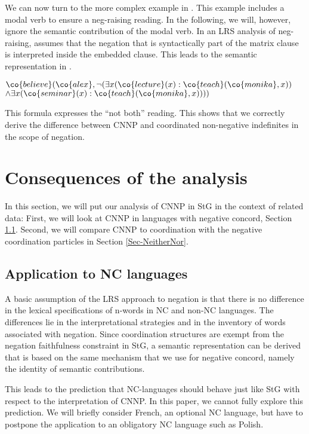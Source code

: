 \documentclass[output=paper]{langsci/langscibook}
\begin{document}
We can now turn to the more complex example in . 
This example includes a modal verb to ensure a neg-raising reading. 
In the following, we will, however, ignore the semantic contribution of the modal verb.
In an LRS analysis of neg-raising, \citet{Sailer:05cssp} assumes that the negation that is syntactically part of the matrix clause is interpreted inside the embedded clause. This leads to the semantic representation in .%

\ea \label{ex-glaub-notEX2-bi}
$\co{believe}(\co{alex},\lnot (\exists x (\co{lecture}(x) : \co{teach}(\co{monika},x))$\\
\hspace*{\fill}
$\land \exists x (\co{seminar}(x) : \co{teach}(\co{monika},x))))$
\z 

This formula expresses the ``not both'' reading. This shows that we correctly derive the difference between CNNP and coordinated non-negative indefinites in the scope of negation.

\section{Consequences of the analysis}
\label{Sec-Analysis-Consequences}

In this section, we will put our analysis of CNNP in StG in the context of related data: First, we will look at CNNP in languages with negative concord, Section \ref{Sec-AnalysisOhterLang}. Second, we will compare CNNP to coordination with the negative coordination particles  in Section \ref{Sec-NeitherNor}.

\subsection{Application to NC languages}
\label{Sec-AnalysisOhterLang}

A basic assumption of the LRS approach to negation is that there is no difference in the lexical specifications of n-words in NC and non-NC languages. 
The differences lie in the interpretational strategies and in the inventory of words associated with negation. 
Since coordination structures are exempt from the negation faithfulness constraint in StG, a semantic representation can be derived that is based on the same mechanism that we use for negative concord, namely the identity of semantic contributions.

This leads to the prediction that NC-languages should behave just like StG with respect to the interpretation of CNNP. 
In this paper, we cannot fully explore this prediction. 
We will briefly consider French, an optional NC language, but have to postpone the application to an obligatory NC language such as Polish.
\end{document}
